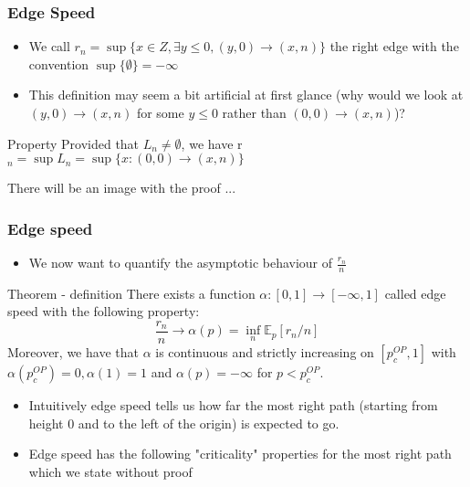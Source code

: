 \begin{frame}
	\frametitle{Edge Speed}
	\begin{itemize}
		\item We call $r_{n} = \sup \{x \in Z, \exists y \leq 0, (y, 0) \rightarrow (x, n)\}$ the right edge with the convention $\sup \{\emptyset\} = - \infty$
		\item This definition may seem a bit artificial at first glance (why would we look at $(y, 0) \rightarrow (x, n)$ for some $y \leq 0$ rather than $(0, 0) \rightarrow (x, n)$)?
	\end{itemize}
	\begin{block}{Property}
		Provided that $L_{n} \neq \emptyset$, we have r$_{n} = \sup L_{n} = \sup \{x: (0, 0) \rightarrow (x, n) \} $
	\end{block}
	\begin{block}{There will be an image with the proof}
	...
	\end{block}
\end{frame}

\begin{frame}
	\frametitle{Edge speed}
	\begin{itemize}
		\item We now want to quantify the asymptotic behaviour of $\frac{r_{n}}{n}$
	\end{itemize}
	\begin{block}{Theorem - definition}
		There exists a function $\alpha: [0, 1] \rightarrow [- \infty, 1]$ called edge speed with the following property:
		$$
			\frac{r_{n}}{n} \rightarrow \alpha (p) = \inf_{n} \mathbb{E}_{p}[r_{n}/n]
		$$
		Moreover, we have that $\alpha$ is continuous and strictly increasing on $[p_{c}^{OP}, 1]$ with $\alpha(p_{c}^{OP}) = 0, \alpha(1) = 1$ and $\alpha(p) = -\infty$ for $p < p_{c}^{OP}$.
	\end{block}
	\begin{itemize}
		\item Intuitively edge speed tells us how far the most right path (starting from height 0 and to the left of the origin) is expected to go.
		\item Edge speed has the following "criticality" properties for the most right path which we state without proof
	\end{itemize}

\end{frame}

